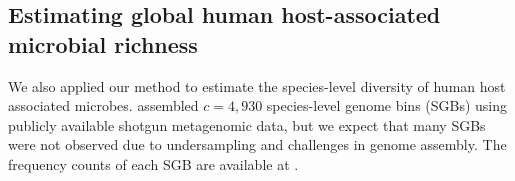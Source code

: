 \documentclass[12pt]{article}
\begin{document}


%


\subsection{Estimating global human host-associated microbial richness}

We also applied our method to estimate the species-level diversity of human host associated microbes.
\cite{pasolli2019extensive} assembled $c=4,930$ species-level genome bins (SGBs) using publicly available shotgun metagenomic data, but we expect that many SGBs were not observed due to undersampling and challenges in genome assembly. The frequency counts of each SGB are available at \citet[Table S4]{pasolli2019extensive}.
\end{document}
